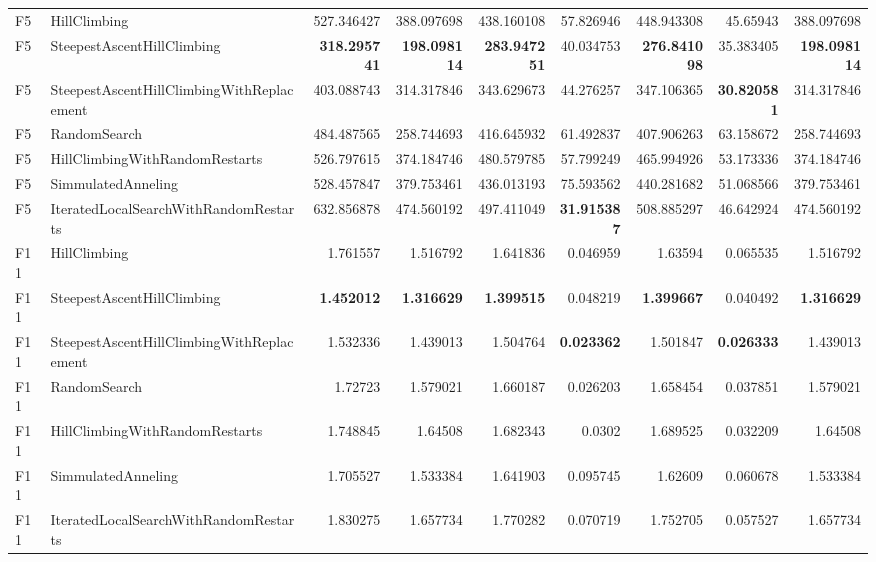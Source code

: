 \begin{tabular}{llrrrrrrr}
F5 & HillClimbing & 527.346427 & 388.097698 & 438.160108 & 57.826946 & 448.943308 & 45.65943 & 388.097698 \\ 
F5 & SteepestAscentHillClimbing & \textbf{318.295741} & \textbf{198.098114} & \textbf{283.947251} & 40.034753 & \textbf{276.841098} & 35.383405 & \textbf{198.098114} \\ 
F5 & SteepestAscentHillClimbingWithReplacement & 403.088743 & 314.317846 & 343.629673 & 44.276257 & 347.106365 & \textbf{30.820581} & 314.317846 \\ 
F5 & RandomSearch & 484.487565 & 258.744693 & 416.645932 & 61.492837 & 407.906263 & 63.158672 & 258.744693 \\ 
F5 & HillClimbingWithRandomRestarts & 526.797615 & 374.184746 & 480.579785 & 57.799249 & 465.994926 & 53.173336 & 374.184746 \\ 
F5 & SimmulatedAnneling & 528.457847 & 379.753461 & 436.013193 & 75.593562 & 440.281682 & 51.068566 & 379.753461 \\ 
F5 & IteratedLocalSearchWithRandomRestarts & 632.856878 & 474.560192 & 497.411049 & \textbf{31.915387} & 508.885297 & 46.642924 & 474.560192 \\ 
F11 & HillClimbing & 1.761557 & 1.516792 & 1.641836 & 0.046959 & 1.63594 & 0.065535 & 1.516792 \\ 
F11 & SteepestAscentHillClimbing & \textbf{1.452012} & \textbf{1.316629} & \textbf{1.399515} & 0.048219 & \textbf{1.399667} & 0.040492 & \textbf{1.316629} \\ 
F11 & SteepestAscentHillClimbingWithReplacement & 1.532336 & 1.439013 & 1.504764 & \textbf{0.023362} & 1.501847 & \textbf{0.026333} & 1.439013 \\ 
F11 & RandomSearch & 1.72723 & 1.579021 & 1.660187 & 0.026203 & 1.658454 & 0.037851 & 1.579021 \\ 
F11 & HillClimbingWithRandomRestarts & 1.748845 & 1.64508 & 1.682343 & 0.0302 & 1.689525 & 0.032209 & 1.64508 \\ 
F11 & SimmulatedAnneling & 1.705527 & 1.533384 & 1.641903 & 0.095745 & 1.62609 & 0.060678 & 1.533384 \\ 
F11 & IteratedLocalSearchWithRandomRestarts & 1.830275 & 1.657734 & 1.770282 & 0.070719 & 1.752705 & 0.057527 & 1.657734 \\ 
\bottomrule
\end{tabular}
